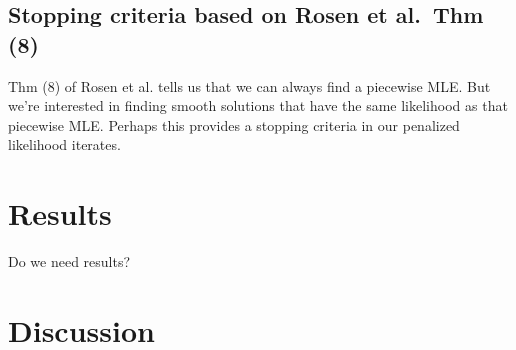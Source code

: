 \documentclass[11pt]{article}
\begin{document}
\subsection*{Stopping criteria based on Rosen et al.\ Thm (8)}\label{sec:model:stopping}

Thm (8) of Rosen et al. \cite{Rosen2018-bb} tells us that we can always find a piecewise MLE.
But we're interested in finding smooth solutions that have the same likelihood as that piecewise MLE.
Perhaps this provides a stopping criteria in our penalized likelihood iterates.


\section*{Results}\label{sec:results}

Do we need results?

\section*{Discussion}\label{sec:discussion}



\end{document}
